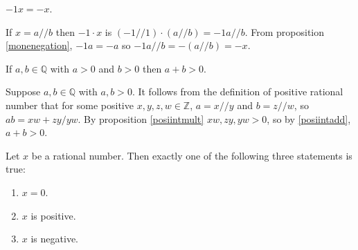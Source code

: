 \documentclass{article}
\begin{document}
\begin{proposition}
	\label{ronenegation}
	\(-1x=-x\).
\end{proposition}
\begin{IEEEproof}
	If \(x=a//b\) then \(-1\cdot x\) is \((-1//1)\cdot(a//b)=-1a//b\). From proposition \ref{monenegation}, \(-1a=-a\) so \(-1a//b=-(a//b)=-x\).
\end{IEEEproof}
\begin{proposition}
	\label{posiratadd}
	If \(a,b\in\mathbb{Q}\) with \(a>0\) and \(b>0\) then \(a+b>0\).
\end{proposition}
\begin{IEEEproof}
	Suppose \(a,b\in\mathbb{Q}\) with \(a,b>0\). It follows from the definition of positive rational number that for some positive \(x,y,z,w\in\mathbb{Z}\), \(a=x//y\) and \(b=z//w\), so \(ab=xw+zy/yw\). By proposition \ref{posiintmult} \(xw,zy,yw>0\), so by \ref{posiintadd}, \(a+b>0\).
\end{IEEEproof}
\begin{lemma}
	Let \(x\) be a rational number. Then exactly one of the following three statements is true:
	\begin{enumerate}
		\item \(x=0\).
		\item \(x\) is positive.
		\item \(x\) is negative.
	\end{enumerate}
\end{lemma}
\end{document}
